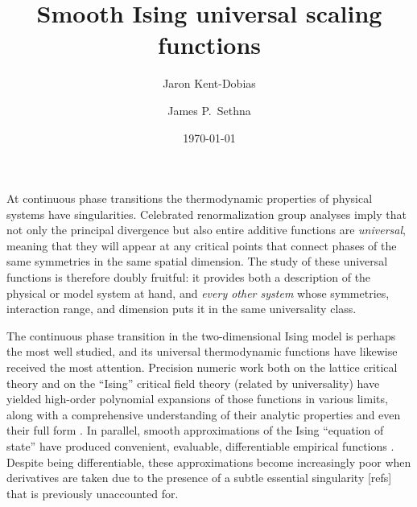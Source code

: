\documentclass[
  aps,
  prb,
  reprint,
  longbibliography,
  floatfix
]{revtex4-2}
\begin{document}
\title{Smooth Ising universal scaling functions}

\author{Jaron Kent-Dobias}

\author{James P.~Sethna}

\date\today

\begin{abstract}
\end{abstract}

\maketitle

At continuous phase transitions the thermodynamic properties of physical
systems have singularities. Celebrated renormalization group analyses imply
that not only the principal divergence but also entire additive functions are
\emph{universal}, meaning that they will appear at any critical points that
connect phases of the same symmetries in the same spatial dimension. The study
of these universal functions is therefore doubly fruitful: it provides both a
description of the physical or model system at hand, and \emph{every other
system} whose symmetries, interaction range, and dimension puts it in the same
universality class.

The continuous phase transition in the two-dimensional Ising model is perhaps
the most well studied, and its universal thermodynamic functions have likewise
received the most attention. Precision numeric work both on the lattice
critical theory and on the ``Ising'' critical field theory (related by
universality) have yielded high-order polynomial expansions of those functions
in various limits, along with a comprehensive understanding of their analytic
properties and even their full form \cite{Fonseca_2003_Ising, Mangazeev_2008_Variational, Mangazeev_2010_Scaling}. In parallel, smooth approximations of the
Ising ``equation of state'' have produced convenient, evaluable, differentiable
empirical functions \cite{Guida_1997_3D, Campostrini_2000_Critical, Caselle_2001_The}. Despite being differentiable, these approximations become
increasingly poor when derivatives are taken due to the presence of a subtle
essential singularity [refs] that is previously unaccounted for.
\end{document}
